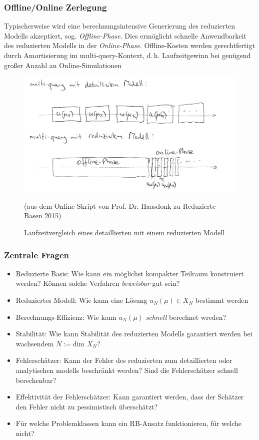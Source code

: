 \subsubsection*{Offline/Online Zerlegung}
\label{Offline/Online Zerlegung}

Typischerweise wird eine berechnungsintensive Generierung des reduzierten Modells akzeptiert, sog. \emph{Offline-Phase}. Dies ermöglicht schnelle Anwendbarkeit des reduzierten Modells in der \emph{Online-Phase}. Offline-Kosten werden gerechtfertigt durch Amortisierung im multi-query-Kontext, d.\,h. Laufzeitgewinn bei genügend großer Anzahl an Online-Simulationen

\begin{figure}[H]
  \centering\small
    \includegraphics[width = 0.6 \textwidth]{Bilder/OfflineOnline.png}
  \caption{Laufzeitvergleich eines detaillierten mit einem reduzierten Modell}{(aus dem Online-Skript von Prof. Dr. Haasdonk zu Reduzierte Basen 2015)}
  \label{fig:OfflineOnline}
\end{figure}

\subsubsection*{Zentrale Fragen}
\label{Zentrale Fragen}

\begin{itemize}
	\item Reduzierte Basis: Wie kann ein möglichst kompakter Teilraum konstruiert werden? Können solche Verfahren \emph{beweisbar} gut sein?
	\item Reduziertes Modell: Wie kann eine Lösung $u_N(\mu) \in X_N$ bestimmt werden
	\item Berechnungs-Effizienz: Wie kann $u_N(\mu)$ \emph{schnell} berechnet wreden?
	\item Stabilität: Wie kann Stabilität des reduzierten Modells garantiert werden bei wachsendem $N := \text{dim } X_N$?
	\item Fehlerschätzer: Kann der Fehler des reduzierten zum detaillierten oder analytischen modells beschränkt werden? Sind die Fehlerschätzer schnell berechenbar?
	\item Effektivität der Fehlerschätzer: Kann garantiert werden, dass der Schätzer den Fehler nicht zu pessimistisch überschätzt?
	\item Für welche Problemklassen kann ein RB-Ansatz funktionieren, für welche nicht?
\end{itemize}

